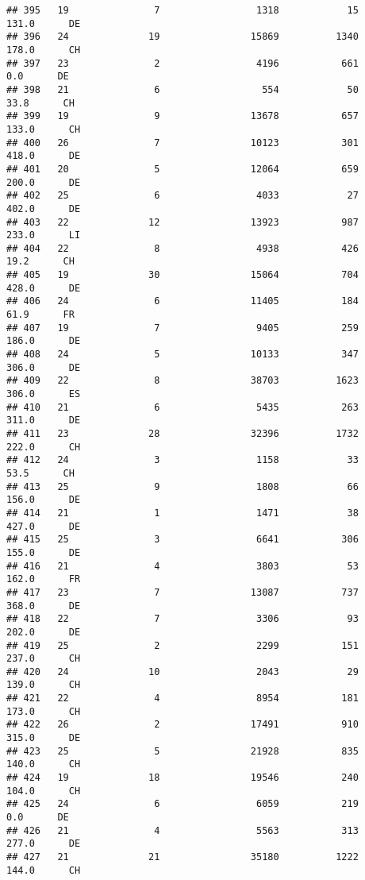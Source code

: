 \documentclass[
]{article}
\begin{document}
\begin{verbatim}
## 395   19               7                 1318            15    131.0      DE
## 396   24              19                15869          1340    178.0      CH
## 397   23               2                 4196           661      0.0      DE
## 398   21               6                  554            50     33.8      CH
## 399   19               9                13678           657    133.0      CH
## 400   26               7                10123           301    418.0      DE
## 401   20               5                12064           659    200.0      DE
## 402   25               6                 4033            27    402.0      DE
## 403   22              12                13923           987    233.0      LI
## 404   22               8                 4938           426     19.2      CH
## 405   19              30                15064           704    428.0      DE
## 406   24               6                11405           184     61.9      FR
## 407   19               7                 9405           259    186.0      DE
## 408   24               5                10133           347    306.0      DE
## 409   22               8                38703          1623    306.0      ES
## 410   21               6                 5435           263    311.0      DE
## 411   23              28                32396          1732    222.0      CH
## 412   24               3                 1158            33     53.5      CH
## 413   25               9                 1808            66    156.0      DE
## 414   21               1                 1471            38    427.0      DE
## 415   25               3                 6641           306    155.0      DE
## 416   21               4                 3803            53    162.0      FR
## 417   23               7                13087           737    368.0      DE
## 418   22               7                 3306            93    202.0      DE
## 419   25               2                 2299           151    237.0      CH
## 420   24              10                 2043            29    139.0      CH
## 421   22               4                 8954           181    173.0      CH
## 422   26               2                17491           910    315.0      DE
## 423   25               5                21928           835    140.0      CH
## 424   19              18                19546           240    104.0      CH
## 425   24               6                 6059           219      0.0      DE
## 426   21               4                 5563           313    277.0      DE
## 427   21              21                35180          1222    144.0      CH

\end{verbatim}
\end{document}
